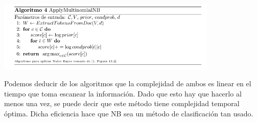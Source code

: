 \documentclass[t,compress,10pt,xcolor=dvipsnames]{beamer}
\begin{document}
{		\framebreak
		
		
		
		\includegraphics[width=10.5cm]{ApplyMN.png}
		
		
		\framebreak
		
		Podemos deducir de los algoritmos que la complejidad de ambos es linear en el tiempo que toma escanear la informaci\'on. Dado que esto hay que hacerlo al menos una vez, se puede decir que este m\'etodo tiene complejidad temporal \'optima. Dicha eficiencia hace que NB sea un m\'etodo de clasificaci\'on tan usado.
	}
\end{document}
